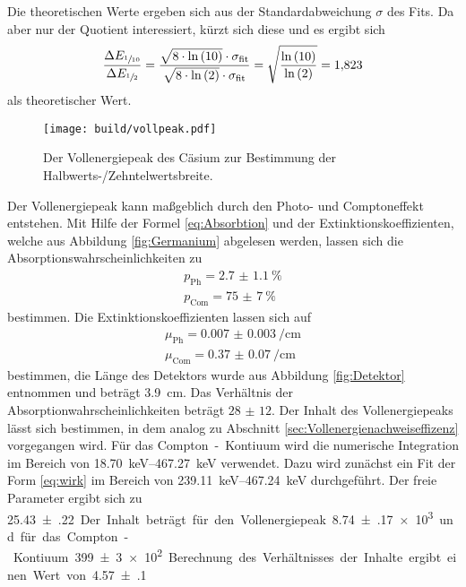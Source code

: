 Die theoretischen Werte ergeben sich aus der Standardabweichung $\sigma$ des Fits. Da aber nur der Quotient interessiert, 
kürzt sich diese und es ergibt sich
\begin{equation}
  \frac{\Delta E_{\sfrac{1}{10}}}{\Delta E_{\sfrac{1}{2}}} = \frac{\sqrt{8 \cdot \ln{(10)}} \cdot \sigma_\text{fit}}{\sqrt{8 \cdot \ln{(2)}} \cdot \sigma_\text{fit}} = \sqrt{\frac{\ln{(10)}}{\ln{(2)}}} = \num{1.823}
\end{equation}
als theoretischer Wert.
\begin{figure}[htb]
 \centering
 \texttt{[image: build/vollpeak.pdf]}
 \caption{Der Vollenergiepeak des Cäsium zur Bestimmung der Halbwerts-/Zehntelwertsbreite.}
 \label{fig:Halb}
\end{figure}

Der Vollenergiepeak kann maßgeblich durch den Photo- und Comptoneffekt entstehen. Mit Hilfe der Formel \ref{eq:Absorbtion} und 
der Extinktionskoeffizienten, welche aus Abbildung \ref{fig:Germanium} abgelesen werden, lassen sich die Absorptionswahrscheinlichkeiten
zu
\begin{align*}
  p_\text{Ph} = \SI{2.7(11)}{\percent} \\
  p_\text{Com} = \SI{75(7)}{\percent}
\end{align*}
bestimmen.
Die Extinktionskoeffizienten lassen sich auf 
\begin{gather*}
  \mu_\text{Ph} = \SI{0.007(3)}{\per\centi\meter} \\
  \mu_\text{Com} = \SI{0.37(7)}{\per\centi\meter}
\end{gather*}
bestimmen, die Länge des Detektors wurde aus Abbildung \ref{fig:Detektor} entnommen und beträgt \SI{3.9}{\centi\meter}.
Das Verhältnis der Absorptionwahrscheinlichkeiten beträgt $\num{28(12)}$.
Der Inhalt des Vollenergiepeaks lässt sich bestimmen, in dem analog zu Abschnitt \ref{sec:Vollenergienachweiseffizenz} 
vorgegangen wird. Für das Compton~-~Kontiuum wird die numerische Integration im Bereich von
\SIrange{18.70}{467.27}{\kilo\electronvolt} verwendet. Dazu wird zunächst ein Fit der 
Form \eqref{eq:wirk} im Bereich von \SIrange{239.11}{467.24}{\kilo\electronvolt} durchgeführt.
Der freie Parameter ergibt sich zu \SI{25.43(22)}. Der Inhalt beträgt für den
Vollenergiepeak \num{8.74(17)e3} und für das Compton-Kontiuum \num{399(3)e2}. 
Berechnung des Verhältnisses der Inhalte ergibt einen Wert von \num{4.57(10)}.
\FloatBarrier

